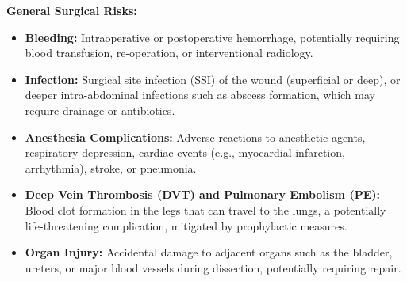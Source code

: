 \textbf{General Surgical Risks:}
\begin{itemize}
  \item \textbf{Bleeding:} Intraoperative or postoperative hemorrhage, potentially requiring blood transfusion, re-operation, or interventional radiology.
  
  \item \textbf{Infection:} Surgical site infection (SSI) of the wound (superficial or deep), or deeper intra-abdominal infections such as abscess formation, which may require drainage or antibiotics.
  
  \item \textbf{Anesthesia Complications:} Adverse reactions to anesthetic agents, respiratory depression, cardiac events (e.g., myocardial infarction, arrhythmia), stroke, or pneumonia.
  
  \item \textbf{Deep Vein Thrombosis (DVT) and Pulmonary Embolism (PE):} Blood clot formation in the legs that can travel to the lungs, a potentially life-threatening complication, mitigated by prophylactic measures.
  
  \item \textbf{Organ Injury:} Accidental damage to adjacent organs such as the bladder, ureters, or major blood vessels during dissection, potentially requiring repair.
\end{itemize}

